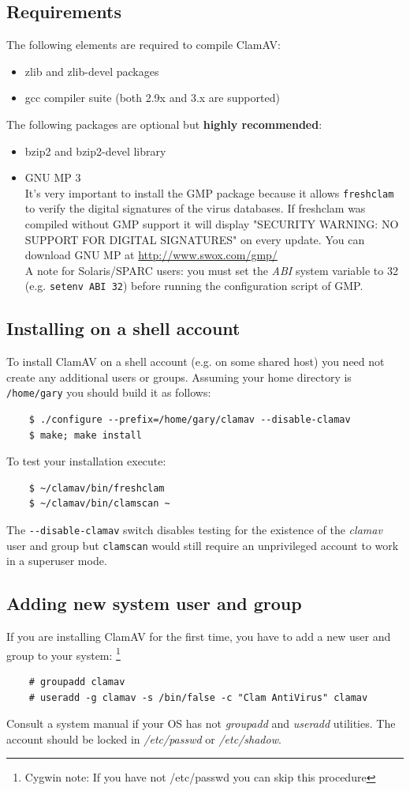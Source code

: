 \documentclass[a4paper,titlepage,12pt]{article}
\begin{document}
    \subsection{Requirements}
    The following elements are required to compile ClamAV:
    \begin{itemize}
	\item zlib and zlib-devel packages
	\item gcc compiler suite (both 2.9x and 3.x are supported)
    \end{itemize}
    The following packages are optional but \textbf{highly recommended}:
    \begin{itemize}
	\item bzip2 and bzip2-devel library
	\item GNU MP 3\\
	It's very important to install the GMP package because it allows
	\verb+freshclam+ to verify the digital signatures of the virus
	databases. If freshclam was compiled without GMP support it will
	display "SECURITY WARNING: NO SUPPORT FOR DIGITAL SIGNATURES" on every
	update. You can download GNU MP at \url{http://www.swox.com/gmp/}\\
	A note for Solaris/SPARC users: you must set the \emph{ABI} system
	variable to 32 (e.g. \verb+setenv ABI 32+) before running the
	configuration script of GMP.
    \end{itemize}

    \subsection{Installing on a shell account}
    To install ClamAV on a shell account (e.g. on some shared host) you
    need not create any additional users or groups. Assuming your
    home directory is \verb+/home/gary+ you should build it as follows:
    \begin{verbatim}
	$ ./configure --prefix=/home/gary/clamav --disable-clamav
	$ make; make install
    \end{verbatim}
    To test your installation execute:
    \begin{verbatim}
	$ ~/clamav/bin/freshclam
	$ ~/clamav/bin/clamscan ~
    \end{verbatim}
    The \verb+--disable-clamav+ switch disables testing for the existence of
    the \emph{clamav} user and group but \verb+clamscan+ would still require an
    unprivileged account to work in a superuser mode.

    \subsection{Adding new system user and group}
    If you are installing ClamAV for the first time, you have to add a new
    user and group to your system: \footnote{Cygwin note: If you have not
    /etc/passwd you can skip this procedure}
    \begin{verbatim}
	# groupadd clamav
	# useradd -g clamav -s /bin/false -c "Clam AntiVirus" clamav
    \end{verbatim}
    Consult a system manual if your OS has not \emph{groupadd} and
    \emph{useradd} utilities. The account should be locked in
    \emph{/etc/passwd} or \emph{/etc/shadow}.
\end{document}
